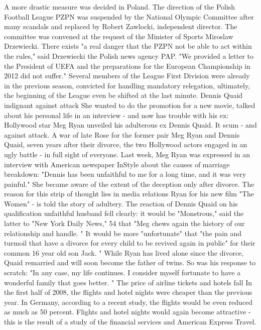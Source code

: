 A more drastic measure was decided in Poland.
The direction of the Polish Football League PZPN was suspended by the National Olympic Committee after many scandals and replaced by Robert Zawlocki, independent director.
The committee was convened at the request of the Minister of Sports Miroslaw Drzewiecki.
There exists "a real danger that the PZPN not be able to act within the rules," said Drzewiecki the Polish news agency PAP.
"We provided a letter to the President of UEFA and the preparations for the European Championship in 2012 did not suffer."
Several members of the League First Division were already in the previous season, convicted for handling mandatory relegation, ultimately, the beginning of the League even be shifted at the last minute.
Dennis Quaid indignant against attack
She wanted to do the promotion for a new movie, talked about his personal life in an interview - and now has trouble with his ex: Hollywood star Meg Ryan unveiled his adulterous ex Dennis Quaid.
It scum - and against attack.
A war of late Rose for the former pair Meg Ryan and Dennis Quaid, seven years after their divorce, the two Hollywood actors engaged in an ugly battle - in full sight of everyone.
Last week, Meg Ryan was expressed in an interview with American newspaper InStyle about the causes of marriage breakdown: "Dennis has been unfaithful to me for a long time, and it was very painful."
She became aware of the extent of the deception only after divorce.
The reason for this strip of thought lies in media relations Ryan for his new film "The Women" - is told the story of adultery.
The reaction of Dennis Quaid on his qualification unfaithful husband fell clearly: it would be "Monstrous," said the latter to "New York Daily News," 54 that "Meg chews again the history of our relationship and handle. "
It would be more "unfortunate" that "the pain and turmoil that have a divorce for every child to be revived again in public" for their common 16 year old son Jack. "
While Ryan has lived alone since the divorce, Quaid remarried and will soon become the father of twins.
So was his response to scratch: "In any case, my life continues.
I consider myself fortunate to have a wonderful family that goes better. "
The price of airline tickets and hotels fall
In the first half of 2008, the flights and hotel nights were cheaper than the previous year.
In Germany, according to a recent study, the flights would be even reduced as much as 50 percent.
Flights and hotel nights would again become attractive - this is the result of a study of the financial services and American Express Travel.
